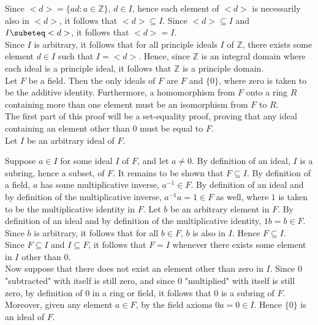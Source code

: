 \documentclass{article}
\theoremstyle{definition}
\newcommand{\Z}{\mathbb{Z}}
\begin{document}
Since $<d> = \{ad: a\in \Z\}$, $d\in I$, hence each element of $<d>$ is necessarily also in $<d>$, it follows that $<d>\subseteq I$. Since $<d>\subseteq I$ and $I\subeteq <d>$, it follows that $<d> = I$.
\\

Since $I$ is arbitrary, it follows that for all principle ideals $I$ of $\Z$, there exists some element $d\in I$ such that $I = <d>$. Hence, since $\Z$ is an integral domain where each ideal is a principle ideal, it follows that $\Z$ is a principle domain.\\

 Let $F$ be a field. Then the only ideals of $F$ are $F$ and $\{0\}$, where zero is taken to be the additive identity. Furthermore, a homomorphism from $F$ onto a ring $R$ containing more than one element must be an isomorphism from $F$ to $R$.\\

 The first part of this proof will be a set-equality proof, proving that any ideal containing an element other than $0$ must be equal to $F$.\\
Let $I$ be an arbitrary ideal of $F$. 

Suppose $a\in I$ for some ideal $I$ of $F$, and let $a\ne 0$. 
By definition of an ideal, $I$ is a subring, hence a subset, of $F$. It remains to be shown that $F\subseteq I$.
By definition of a field, $a$ has some multiplicative inverse, $a^{-1} \in F$. By definition of an ideal and by definition of the multiplicative inverse, $a^{-1}a = 1\in F$ as well, where $1$ is taken to be the multiplicative identity in $F$. Let $b$ be an arbitrary element in $F$. By definition of an ideal and by definition of the multiplicative identity, $1b = b\in F$. Since $b$ is arbitrary, it follows that for all $b\in F$, $b$ is also in $I$. Hence $F\subseteq I$.\\
Since $F\subseteq I$ and $I\subseteq F$, it follows that $F = I$ whenever there exists some element in $I$ other than $0$.\\

Now suppose that there does not exist an element other than zero in $I$. Since $0$ "subtracted" with itself is still zero, and since $0$ "multiplied" with itself is still zero, by definition of $0$ in a ring or field, it follows that $0$ is a subring of $F$. Moreover, given any element $a\in F$, by the field axioms $0a = 0 \in I$. Hence $\{0\}$ is an ideal of $F$.\\
\end{document}
